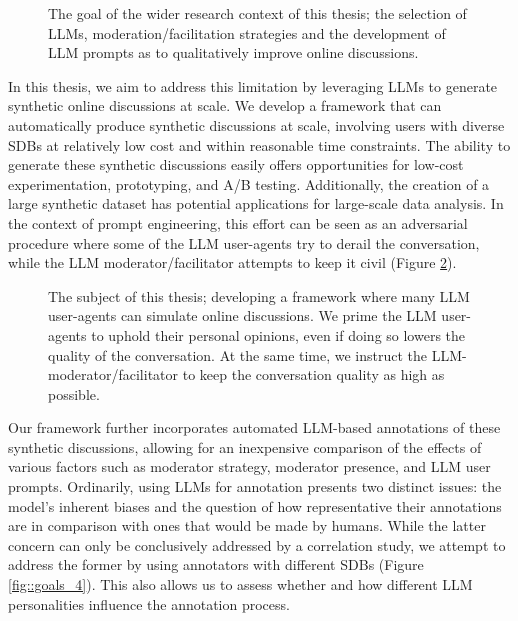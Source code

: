 \begin{figure}
	\centering
	
	\caption{The goal of the wider research context of this thesis; the selection of LLMs, moderation/facilitation strategies and the development of LLM prompts as to qualitatively improve online discussions.}
	\label{fig::goals_2}
\end{figure}

In this thesis, we aim to address this limitation by leveraging \acp{LLM} to generate synthetic online discussions at scale. We develop a framework that can automatically produce synthetic discussions at scale, involving users with diverse \acp{SDB} at relatively low cost and within reasonable time constraints. The ability to generate these synthetic discussions easily offers opportunities for low-cost experimentation, prototyping, and A/B testing. Additionally, the creation of a large synthetic dataset has potential applications for large-scale data analysis. In the context of prompt engineering, this effort can be seen as an adversarial procedure where some of the LLM user-agents try to derail the conversation, while the LLM moderator/facilitator attempts to keep it civil (Figure \ref{fig::goals_3}).

\begin{figure}
	\centering
	
	\caption{The subject of this thesis; developing a framework where many LLM user-agents can simulate online discussions. We prime the LLM user-agents to uphold their personal opinions, even if doing so lowers the quality of the conversation. At the same time, we instruct the LLM-moderator/facilitator to keep the conversation quality as high as possible.}
	\label{fig::goals_3}
\end{figure}

Our framework further incorporates automated LLM-based annotations of these synthetic discussions, allowing for an inexpensive comparison of the effects of various factors such as moderator strategy, moderator presence, and LLM user prompts. Ordinarily, using LLMs for annotation presents two distinct issues: the model's inherent biases and the question of how representative their annotations are in comparison with ones that would be made by humans. While the latter concern can only be conclusively addressed by a correlation study, we attempt to address the former by using annotators with different \acp{SDB} (Figure \ref{fig::goals_4}). This also allows us to assess whether and how different LLM personalities influence the annotation process. 

